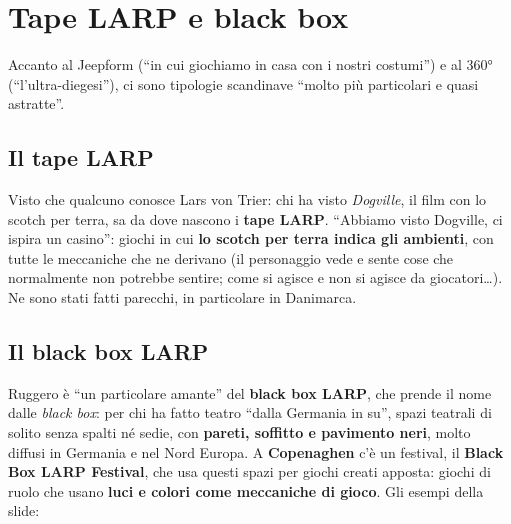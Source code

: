 \section{Tape LARP e black box}
\label{a2:sec:blackbox}



Accanto al Jeepform (``in cui giochiamo in casa con i nostri costumi'') e al
360° (``l'ultra-diegesi''), ci sono tipologie scandinave ``molto più particolari
e quasi astratte''.

\subsection{Il tape LARP}

Visto che qualcuno conosce Lars von Trier: chi ha visto \emph{Dogville}, il film
con lo scotch per terra, sa da dove nascono i \textbf{tape LARP}. ``Abbiamo visto
Dogville, ci ispira un casino'': giochi in cui \textbf{lo scotch per terra indica
gli ambienti}, con tutte le meccaniche che ne derivano (il personaggio vede e
sente cose che normalmente non potrebbe sentire; come si agisce e non si agisce
da giocatori\ldots). Ne sono stati fatti parecchi, in particolare in Danimarca.

\subsection{Il black box LARP}

Ruggero è ``un particolare amante'' del \textbf{black box LARP}, che prende il
nome dalle \emph{black box}: per chi ha fatto teatro ``dalla Germania in su'',
spazi teatrali di solito senza spalti né sedie, con \textbf{pareti, soffitto e
pavimento neri}, molto diffusi in Germania e nel Nord Europa. A
\textbf{Copenaghen} c'è un festival, il \textbf{Black Box LARP Festival}, che usa
questi spazi per giochi creati apposta: giochi di ruolo che usano \textbf{luci e
colori come meccaniche di gioco}. Gli esempi della slide:

